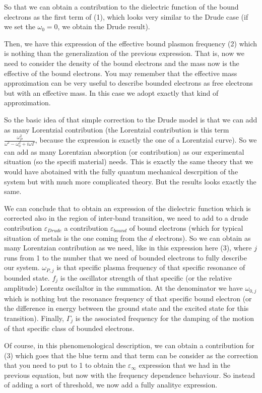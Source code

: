 \documentclass[../main/main.tex]{subfiles}
\begin{document}
So that we can obtain a contribution to the dielectric function of the bound electrons as the first term of (1), which looks very similar to the Drude case (if we set the \( \omega _0 =0 \), we obtain the Drude result).

Then, we have this expression of the effective bound plasmon frequency (2) which is nothing than the generalization of the previous expression. That is, now we need to consider the density of the bound electrons and the mass now is the effective of the bound electrons. You may remember that the effective mass approximation can be very useful to describe bounded electrons as free electrons but with an effective mass. In this case we adopt exactly that kind of approximation.

So the basic idea of that simple correction to the Drude model is that we can add as many Lorentzial contribution (the Lorentzial contribution is this term \( \frac{\omega _P^2}{\omega ^2 - \omega _0^2 + i \omega \Gamma } \), because the expression is exactly the one of a Lorentzial curve).
So we can add as many Lorentzian absorption (or contribution) as our experimental situation (so the specifi material) needs.
This is exactly the same theory that we would have abotained with the fully quantum mechanical descrpition of the system but with much more complicated theory. But the results looks exactly the same.

We can conclude that to obtain an expression of the dielectric function which is corrected also in the region of inter-band transition, we need to add to a drude contribution \( \varepsilon _{Drude} \) a contribution \( \varepsilon _{bound} \) of bound electrons (which for typical situation of metals is the one coming from the \( d \) electrons). So we can obtain as many Lorentzian contribution as we need, like in this expression here (3), where \( j \) runs from 1 to the number that we need of bounded electrons to fully describe our system.
\( \omega _{P,j} \) is that specific plasma frequency of that specific resonance of bounded state. \( f_j \) is the oscillator strength of that specific (or the relative amplitude) Lorentz oscilaltor in the summation. At the denominator we have \( \omega _{0,j} \) which is nothing but the resonance frequency of that specific bound electron (or the difference in energy between the ground state and the excited state for this transition). Finally, \( \Gamma_j \) is the associated frequency for the damping of the motion of that specific class of bounded electrons.

Of course, in this phenomenological description, we can obtain a contribution for (3) which goes that the blue term and that term can be consider as the correction that you need to put to 1 to obtain the \( \varepsilon _ \infty  \) expression that we had in the previous equation, but now with the frequency dependence behaviour. So instead of adding a sort of threshold, we now add a fully analityc expression.
\end{document}
